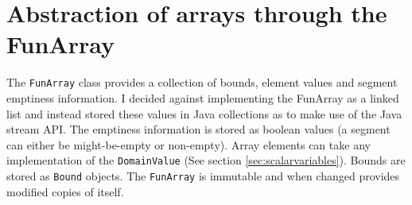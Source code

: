 \documentclass{report}
\begin{document}
\section{Abstraction of arrays through the FunArray}

The \texttt{FunArray} class provides a collection of bounds, element values and segment emptiness information. I decided against implementing the FunArray as a linked list and instead stored these values in Java collections as to make use of the Java stream API. The emptiness information is stored as boolean values (a segment can either be might-be-empty or non-empty). Array elements can take any implementation of the \texttt{DomainValue} (See section \ref{sec:scalarvariables}). Bounds are stored as \texttt{Bound} objects. The \texttt{FunArray} is immutable and when changed provides modified copies of itself.
\end{document}
